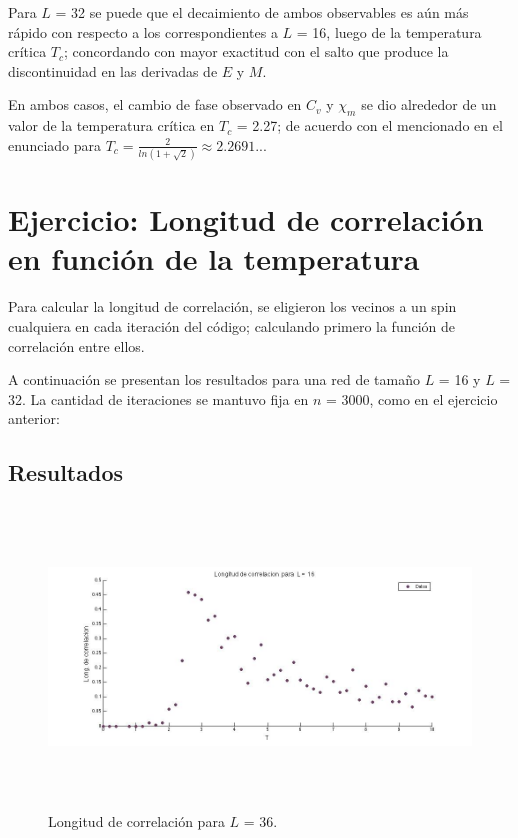\documentclass[a4paper,12pt]{article}
\begin{document}
Para $L$ = 32 se puede que el decaimiento de ambos observables es a\'un m\'as r\'apido con respecto a los correspondientes a $L$ = 16, luego de la temperatura cr\'itica $T_{c}$; concordando con mayor exactitud con el salto que produce la discontinuidad en las derivadas de $E$ y $M$.

En ambos casos, el cambio de fase observado en $C_{v}$ y $\chi_{m}$ se dio alrededor de un valor de la temperatura cr\'itica en $T_{c}$ = 2.27; de acuerdo con el mencionado en el enunciado para $T_{c} = \frac{2}{ln(1+\sqrt{2})} \approx 2.2691...$


\section{Ejercicio: Longitud de correlaci\'on en funci\'on de la temperatura}

Para calcular la longitud de correlaci\'on, se eligieron los vecinos a un spin cualquiera en cada iteraci\'on del c\'odigo; calculando primero la funci\'on de correlaci\'on entre ellos. 

A continuaci\'on se presentan los resultados para una red de tama\~no $L$ = 16 y $L$ = 32. La cantidad de iteraciones se mantuvo fija en $n$ = 3000, como en el ejercicio anterior:

\subsection{Resultados}

\begin{figure}[H]
\begin{center}
\includegraphics[height=8cm,width=20cm]{../graficos/Lcorr_L16.jpg}
\caption[width=5cm]{Longitud de correlaci\'on para $L$ = 36.}
\end{center}
\end{figure}
\end{document}
